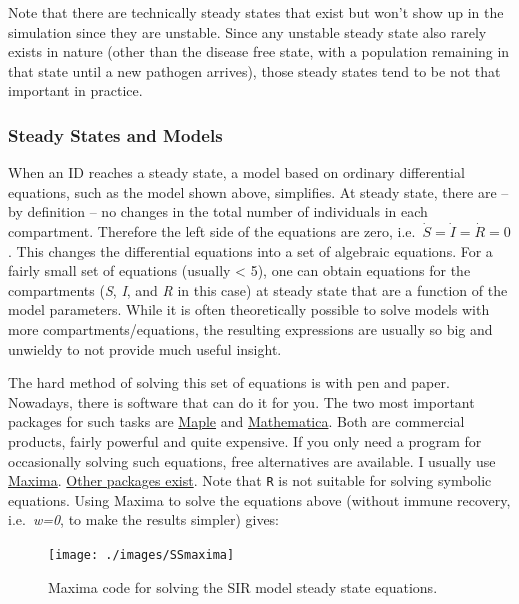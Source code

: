 \documentclass[
]{book}
\begin{document}
Note that there are technically steady states that exist but won't show up in the simulation since they are unstable. Since any unstable steady state also rarely exists in nature (other than the disease free state, with a population remaining in that state until a new pathogen arrives), those steady states tend to be not that important in practice.

\hypertarget{myadvancedbox}{%
\subsubsection{Steady States and Models}\label{myadvancedbox}}

When an ID reaches a steady state, a model based on ordinary differential equations, such as the model shown above, simplifies. At steady state, there are -- by definition -- no changes in the total number of individuals in each compartment. Therefore the left side of the equations are zero, i.e.~\(\dot S = \dot I = \dot R =0\). This changes the differential equations into a set of algebraic equations. For a fairly small set of equations (usually \textless{} 5), one can obtain equations for the compartments (\emph{S}, \emph{I}, and \emph{R} in this case) at steady state that are a function of the model parameters. While it is often theoretically possible to solve models with more compartments/equations, the resulting expressions are usually so big and unwieldy to not provide much useful insight.

The hard method of solving this set of equations is with pen and paper. Nowadays, there is software that can do it for you. The two most important packages for such tasks are \href{http://www.maplesoft.com/}{Maple} and \href{https://www.wolfram.com/mathematica/}{Mathematica}. Both are commercial products, fairly powerful and quite expensive. If you only need a program for occasionally solving such equations, free alternatives are available. I usually use \href{http://maxima.sourceforge.net/}{Maxima}. \href{http://en.wikipedia.org/wiki/Comparison_of_computer_algebra_systems}{Other packages exist}. Note that \texttt{R} is not suitable for solving symbolic equations. Using Maxima to solve the equations above (without immune recovery, i.e.~\emph{w=0}, to make the results simpler) gives:

\begin{figure}
\texttt{[image: ./images/SSmaxima]} \caption{Maxima code for solving the SIR model steady state equations.}\label{fig:SSmaxima}
\end{figure}
\end{document}

